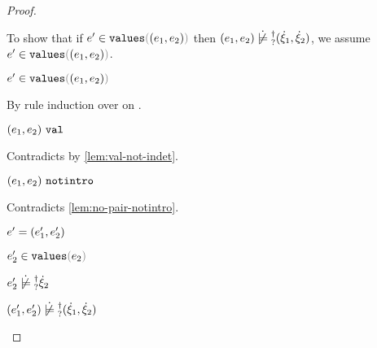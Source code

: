 \begin{proof}
\begin{byCases}
\begin{byCases}
\begin{byCases}
\begin{byCases}
\begin{byCases}
            To show that if $\inValues{e'}{\hpair{e_1}{e_2}}$ then $\cnotsatisfyormay{\hpair{e_1}{e_2}}{\cpair{\hxi_1}{\hxi_2}}$, we assume $\inValues{e'}{\hpair{e_1}{e_2}}$.
            \begin{pfsteps*}
            \item $\inValues{e'}{\hpair{e_1}{e_2}}$  
            \end{pfsteps*}
            By rule induction over  on .
            \begin{byCases}
              \item[\text{(\ref{rule:IVVal})}]
              \begin{pfsteps*}
              \item $(e_1 , e_2) ~\mathtt{val}$ 
              \end{pfsteps*} 
              Contradicts  by \autoref{lem:val-not-indet}.
              \item[\text{(\ref{rule:IVIndet})}] 
              \begin{pfsteps*}
              \item $(e_1 , e_2) ~\mathtt{notintro}$ 
              \end{pfsteps*}
              Contradicts \autoref{lem:no-pair-notintro}.
              \item[\text{(\ref{rule:IVPair})}]
              \begin{pfsteps*}
              \item $e'=(e_1' , e_2')$ 
              \item $\inValues{e_2'}{e_2}$  
              \item $\cnotsatisfyormay{e_2'}{\hxi_2}$  
              \item $\cnotsatisfyormay{\hpair{e_1'}{e_2'}}{\cpair{\hxi_1}{\hxi_2}}$ 
              \end{pfsteps*} 
            \end{byCases}
          \end{byCases}
        \end{byCases}
        \item[\text{(\ref{rule:IInl})}] 

\end{byCases}
\end{byCases}
\end{byCases}
\end{proof}

